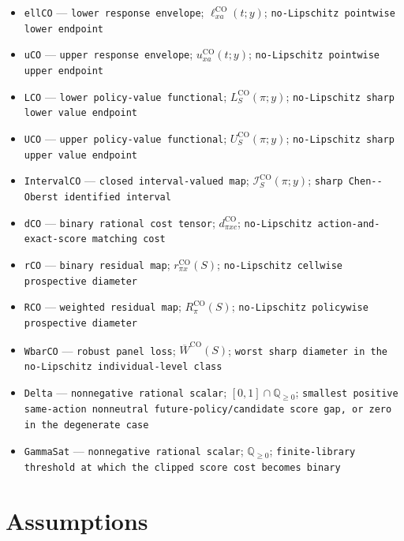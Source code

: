 \documentclass{article}
\begin{document}
\begin{itemize}
  \item \texttt{ellCO} --- \texttt{lower response envelope}; \(\ell^{\mathrm{CO}}_{xa}(t;y)\); \texttt{no-\allowbreak{}Lipschitz pointwise lower endpoint}
  \item \texttt{uCO} --- \texttt{upper response envelope}; \(u^{\mathrm{CO}}_{xa}(t;y)\); \texttt{no-\allowbreak{}Lipschitz pointwise upper endpoint}
  \item \texttt{LCO} --- \texttt{lower policy-\allowbreak{}value functional}; \(L^{\mathrm{CO}}_S(\pi;y)\); \texttt{no-\allowbreak{}Lipschitz sharp lower value endpoint}
  \item \texttt{UCO} --- \texttt{upper policy-\allowbreak{}value functional}; \(U^{\mathrm{CO}}_S(\pi;y)\); \texttt{no-\allowbreak{}Lipschitz sharp upper value endpoint}
  \item \texttt{IntervalCO} --- \texttt{closed interval-\allowbreak{}valued map}; \(\mathcal I^{\mathrm{CO}}_S(\pi;y)\); \texttt{sharp Chen-\allowbreak{}-\allowbreak{}Oberst identified interval}
  \item \texttt{dCO} --- \texttt{binary rational cost tensor}; \(d^{\mathrm{CO}}_{\pi xc}\); \texttt{no-\allowbreak{}Lipschitz action-\allowbreak{}and-\allowbreak{}exact-\allowbreak{}score matching cost}
  \item \texttt{rCO} --- \texttt{binary residual map}; \(r^{\mathrm{CO}}_{\pi x}(S)\); \texttt{no-\allowbreak{}Lipschitz cellwise prospective diameter}
  \item \texttt{RCO} --- \texttt{weighted residual map}; \(R^{\mathrm{CO}}_{\pi}(S)\); \texttt{no-\allowbreak{}Lipschitz policywise prospective diameter}
  \item \texttt{WbarCO} --- \texttt{robust panel loss}; \(\overline W^{\mathrm{CO}}(S)\); \texttt{worst sharp diameter in the no-\allowbreak{}Lipschitz individual-\allowbreak{}level class}
  \item \texttt{Delta} --- \texttt{nonnegative rational scalar}; \([0,1]\cap\mathbb Q_{\geq0}\); \texttt{smallest positive same-\allowbreak{}action nonneutral future-\allowbreak{}policy/\allowbreak{}candidate score gap,\allowbreak{} or zero in the degenerate case}
  \item \texttt{GammaSat} --- \texttt{nonnegative rational scalar}; \(\mathbb Q_{\geq0}\); \texttt{finite-\allowbreak{}library threshold at which the clipped score cost becomes binary}
\end{itemize}

\section{Assumptions}
\end{document}

